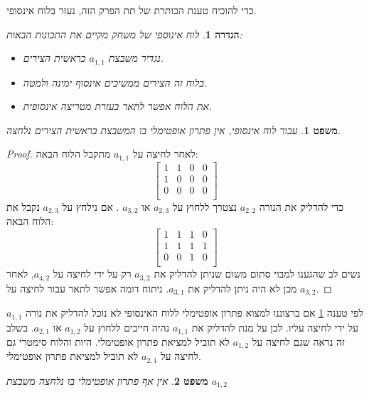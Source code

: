 \documentclass[12pt,leqno]{article}
\theoremstyle{theoremdd}
\newtheorem{definition}{הגדרה}[section]
\newtheorem{theorem}{משפט}[section]
\begin{document}
כדי להוכיח טענת הכותרת של תת הפרק הזה, נעזר בלוח אינסופי.
\begin{definition}
    לוח אינוספי של משחק מקיים את התכונות הבאות:
    \begin{itemize}
        \item 
        נגדיר משבצת 
        $a_{1,1}$
        כראשית הצירים.
        \item 
        בלוח זה הצירים ממשיכים אינסוף ימינה ולמטה.
        \item 
        את הלוח אפשר לתאר בעזרת מטריצה אינסופית.
    \end{itemize}
\end{definition}
\begin{theorem}
    \label{thm:cant-press-a11}
    עבור לוח אינסופי,
    אין פתרון 
    אופטימלי בו המשבצת בראשית הצירים נלחצה.
\end{theorem}
\begin{proof}
    לאחר לחיצה על 
    $a_{1,1}$
    מתקבל הלוח הבאה:
    \[
        \begin{bmatrix}
            1 & 1 & 0 & 0 \\
            1 & 0 & 0 & 0 \\
            0 & 0 & 0 & 0 \\
        \end{bmatrix}
    \]
    כדי להדליק 
    את הנורה
    $a_{2,2}$
    נצטרך 
    ללחוץ
    על
    $a_{2,3}$
    או 
    $a_{3,2}$
    .
    אם נילחץ על
   $a_{2,3}$
   נקבל את הלוח הבאה:
   \[
        \begin{bmatrix}
            1 & 1 & 1 & 0 \\
            1 & 1 & 1 & 1 \\
            0 & 0 & 1 & 0 \\
        \end{bmatrix}
    \]
    נשים לב שהגענו למבוי סתום 
    משום שניתן להדליק את 
    $a_{3,2}$
    רק על ידי לחיצה על 
   $a_{4,2}$,
   לאחר מכן לא היה ניתן להדליק את 
   $a_{3,1}$.
   ניתוח דומה אפשר לתאר עבור 
   לחיצה על 
   $a_{3,2}$.
\end{proof}
לפי טענה
\ref{thm:cant-press-a11}
אם ברצוננו למצוא פתרון אופטימלי ללוח האינסופי לא נוכל 
להדליק את נורה 
$a_{1,1}$
על ידי לחיצה עליו.
לכן על מנת להדליק את 
$a_{1,1}$
נהיה חייבים ללחוץ על 
$a_{1,2}$
או 
$a_{2,1}$.
בשלב זה נראה שגם לחיצה על 
$a_{1,2}$
לא תוביל למציאת פתרון אופטימלי.
היות והלוח סימטרי גם
לחיצה על 
$a_{2,1}$
לא תוביל למציאת פתרון אופטימלי.
\begin{theorem}
    \label{thm:cant-press-a12}
    אין אף פתרון 
    אופטימלי בו נלחצה 
    משבצת
    $a_{1,2}$
\end{theorem}
\end{document}
